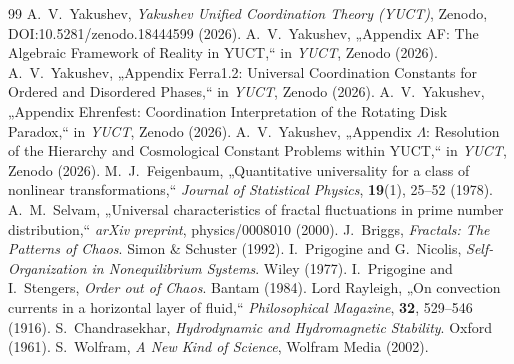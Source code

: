 \documentclass[12pt,a4paper]{article}
\begin{document}
	\begin{thebibliography}{99}
		 A.~V.~Yakushev, \emph{Yakushev Unified Coordination Theory (YUCT)}, Zenodo, DOI:10.5281/zenodo.18444599 (2026).
		 A.~V.~Yakushev, „Appendix AF: The Algebraic Framework of Reality in YUCT,“ in \emph{YUCT}, Zenodo (2026).
		 A.~V.~Yakushev, „Appendix Ferra1.2: Universal Coordination Constants for Ordered and Disordered Phases,“ in \emph{YUCT}, Zenodo (2026).
		 A.~V.~Yakushev, „Appendix Ehrenfest: Coordination Interpretation of the Rotating Disk Paradox,“ in \emph{YUCT}, Zenodo (2026).
		 A.~V.~Yakushev, „Appendix $\Lambda$: Resolution of the Hierarchy and Cosmological Constant Problems within YUCT,“ in \emph{YUCT}, Zenodo (2026).
		 M.~J.~Feigenbaum, „Quantitative universality for a class of nonlinear transformations,“ \emph{Journal of Statistical Physics}, \textbf{19}(1), 25--52 (1978).
		 A.~M.~Selvam, „Universal characteristics of fractal fluctuations in prime number distribution,“ \emph{arXiv preprint}, physics/0008010 (2000).
		 J.~Briggs, \emph{Fractals: The Patterns of Chaos}. Simon \& Schuster (1992).
		 I.~Prigogine and G.~Nicolis, \emph{Self-Organization in Nonequilibrium Systems}. Wiley (1977).
		 I.~Prigogine and I.~Stengers, \emph{Order out of Chaos}. Bantam (1984).
		 Lord Rayleigh, „On convection currents in a horizontal layer of fluid,“ \emph{Philosophical Magazine}, \textbf{32}, 529--546 (1916).
		 S.~Chandrasekhar, \emph{Hydrodynamic and Hydromagnetic Stability}. Oxford (1961).
		 S.~Wolfram, \emph{A New Kind of Science}, Wolfram Media (2002).
	\end{thebibliography}
	
\end{document}
